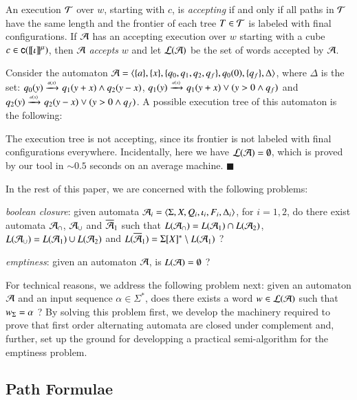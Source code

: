 An execution $\mathcal{T}$ over $w$, starting with $c$, is \emph{accepting} if
and only if all paths in $\mathcal{T}$ have the same length and the frontier of
each tree $T \in \mathcal{T}$ is labeled with final configurations.  If $\mathcal{A}$
has an accepting execution over $w$ starting with a cube $c \in
\mathsf{c}({{\bf [\![} \iota {\bf ]\!]}^\mu})$, then $\mathcal{A}$ \emph{accepts} $w$ and let
${\mathcal L}({\mathcal{A}})$ be the set of words accepted by $\mathcal{A}$.

\begin{example}\label{ex:foada}
  Consider the automaton $\mathcal{A} = \langle \{ a \}, \{ x \},
    \{ q_0,q_1,q_2,q_f \}, q_0(0), \{ q_f \}, \Delta \rangle$, where $\Delta$
  is the set: \(q_0(y) \xrightarrow{{\scriptscriptstyle a(x)}}_{{\scriptstyle }} q_1(y+x) \wedge q_2(y-x)\),
  \(q_1(y) \xrightarrow{{\scriptscriptstyle a(x)}}_{{\scriptstyle }} q_1(y+x) \vee (y > 0 \wedge q_f)\) and
  \(q_2(y) \xrightarrow{{\scriptscriptstyle a(x)}}_{{\scriptstyle }} q_2(y-x) \vee (y > 0 \wedge q_f)\). A
  possible execution tree of this automaton is the following:
  \begin{center}
    
  \end{center}
  The execution tree is not accepting, since its frontier is not
  labeled with final configurations everywhere. Incidentally, here we
  have ${\mathcal L}({\mathcal{A}}) = \emptyset$, which is proved by our tool in
  $\sim\!0.5$ seconds on an average machine. \hfill$\blacksquare$
\end{example}

In the rest of this paper, we are concerned with the following
problems: \begin{compactenum}
\item \emph{boolean closure}: given automata $\mathcal{A}_i =
  \langle \Sigma,X,Q_i,\iota_i,F_i,\Delta_i \rangle$, for $i=1,2$, do there
  exist automata $\mathcal{A}_\cap$, $\mathcal{A}_\cup$ and $\overline{\mathcal{A}}_1$ such that
  $L(\mathcal{A}_\cap) = L(\mathcal{A}_1) \cap L(\mathcal{A}_2)$, $L(\mathcal{A}_\cup) = L(\mathcal{A}_1) \cup
  L(\mathcal{A}_2)$ and $L(\overline{\mathcal{A}}_1) = \Sigma[X]^* \setminus L(\mathcal{A}_1)$ ?
%
\item \emph{emptiness}: given an automaton $\mathcal{A}$, is $L(\mathcal{A}) =
  \emptyset$ ?
\end{compactenum}
For technical reasons, we address the following problem next: given an
automaton $\mathcal{A}$ and an input sequence $\alpha \in \Sigma^*$, does there
exists a word $w \in {\mathcal L}({\mathcal{A}})$ such that ${w}_\Sigma = \alpha$ ?  By
solving this problem first, we develop the machinery required to prove
that first order alternating automata are closed under complement and,
further, set up the ground for developping a practical semi-algorithm
for the emptiness problem.

\subsection{Path Formulae}
\label{sec:path-formulae}

